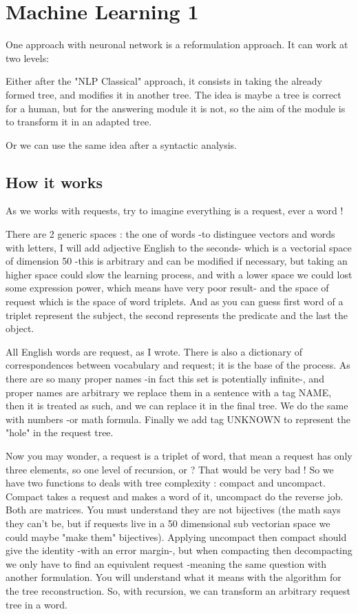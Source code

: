 \section{Machine Learning 1}

One approach with neuronal network is a reformulation approach. It can work at two levels: 

Either after the "NLP Classical" approach, it consists in taking the already formed tree, and modifies it in another tree. The idea is maybe a tree is correct for a human, but for the answering module it is not, so the aim of the module is to transform it in an adapted tree.

Or we can use the same idea after a syntactic analysis. 

\subsection{How it works}

As we works with requests, try to imagine everything is a request, ever a word !

There are 2 generic spaces : the one of words -to distinguee vectors and words with letters, I will add adjective English to the seconds- which is a vectorial space of dimension 50 -this is arbitrary and can be modified if necessary, but taking an higher space could slow the learning process, and with a lower space we could lost some expression power, which means have very poor result- and the space of request which is the space of word triplets. And as you can guess first word of a triplet represent the subject, the second represents the predicate and the last the object.

All English words are request, as I wrote. There is also a dictionary of correspondences between vocabulary and request; it is the base of the process. As there are so many proper names -in fact this set is potentially infinite-, and proper names are arbitrary we replace them in a sentence with a tag NAME, then it is treated as such, and we can replace it in the final tree. We do the same with numbers -or math formula. Finally we add tag UNKNOWN to represent the "hole" in the request tree.

Now you may wonder, a request is a triplet of word, that mean a request has only three elements, so one level of recursion, or ? That would be very bad ! So we have two functions to deals with tree complexity : compact and uncompact. Compact takes a request and makes a word of it, uncompact do the reverse job. Both are matrices. You must understand they are not bijectives (the math says they can't be, but if requests live in a 50 dimensional sub vectorian space we could maybe "make them" bijectives). Applying uncompact then compact should give the identity -with an error margin-, but when compacting then decompacting we only have to find an equivalent request -meaning the same question with another formulation. You will understand what it means with the algorithm for the tree reconstruction. So, with recursion, we can transform an arbitrary request tree in a word.


